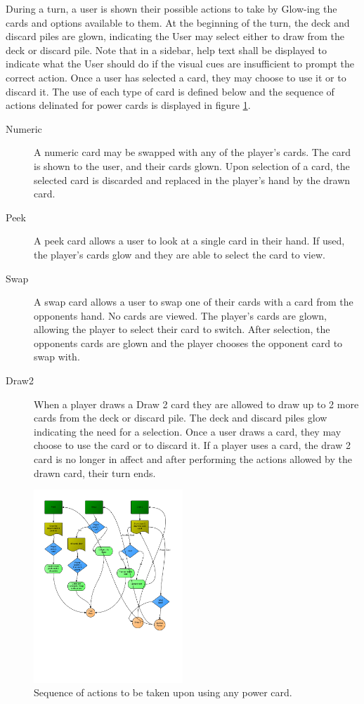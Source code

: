 \documentclass[12pt]{IEEEtran}
\begin{document}
	During a turn, a user is shown their possible actions to take by Glow-ing the cards and options available to them. At the beginning of the turn, the deck and discard piles are glown, indicating the User may select either to draw from the deck or discard pile. Note that in a sidebar, help text shall be displayed to indicate what the User should do if the visual cues are insufficient to prompt the correct action. Once a user has selected a card, they may choose to use it or to discard it. The use of each type of card is defined below and the sequence of actions delinated for power cards is displayed in figure \ref{fig:powact}.
	\begin{description}
		\item[Numeric] \hspace{1em} A numeric card may be swapped with any of the player's cards. The card is shown to the user, and their cards glown. Upon selection of a card, the selected card is discarded and replaced in the player's hand by the drawn card.
		\item[Peek] A peek card allows a user to look at a single card in their hand. If used, the player's cards glow and they are able to select the card to view.
		\item[Swap] A swap card allows a user to swap one of their cards with a card from the opponents hand. No cards are viewed. The player's cards are glown, allowing the player to select their card to switch. After selection, the opponents cards are glown and the player chooses the opponent card to swap with. 
		\item[Draw2] When a player draws a Draw 2 card they are allowed to draw up to 2 more cards from the deck or discard pile. The deck and discard piles glow indicating the need for a selection. Once a user draws a card, they may choose to use the card or to discard it. If a player uses a card, the draw 2 card is no longer in affect and after performing the actions allowed by the drawn card, their turn ends. 
	\end{description}
	
	\begin{figure}[h]
		\centering
		\includegraphics[width=0.5\textwidth]{powercardactions.png}
		\caption{Sequence of actions to be taken upon using any power card.}
		\label{fig:powact}
	\end{figure}
\end{document}
